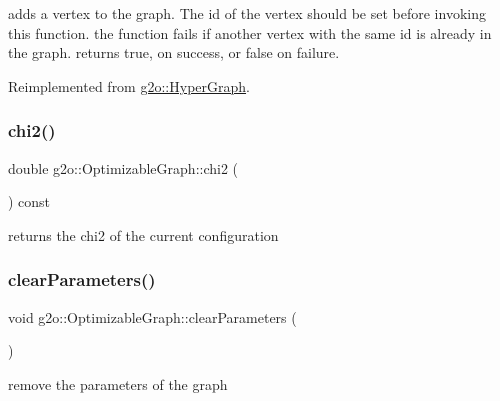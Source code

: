 adds a vertex to the graph. The id of the vertex should be set before invoking this function. the function fails if another vertex with the same id is already in the graph. returns true, on success, or false on failure. 

Reimplemented from \mbox{\hyperlink{classg2o_1_1_hyper_graph_a7ef87ba3479827b24c6fc29c5fc3aa21}{g2o\+::\+Hyper\+Graph}}.

\mbox{\label{structg2o_1_1_optimizable_graph_af0d53383e22347aba1bf76c1ce492f51}} 
\subsubsection{\texorpdfstring{chi2()}{chi2()}}
{\footnotesize\ttfamily double g2o\+::\+Optimizable\+Graph\+::chi2 (\begin{DoxyParamCaption}{ }\end{DoxyParamCaption}) const}



returns the chi2 of the current configuration 

\mbox{\label{structg2o_1_1_optimizable_graph_a15171b6d335115858e2e86dcf576ba78}} 
\subsubsection{\texorpdfstring{clear\+Parameters()}{clearParameters()}}
{\footnotesize\ttfamily void g2o\+::\+Optimizable\+Graph\+::clear\+Parameters (\begin{DoxyParamCaption}{ }\end{DoxyParamCaption})\hspace{0.3cm}{\ttfamily [virtual]}}

remove the parameters of the graph \mbox{\label{structg2o_1_1_optimizable_graph_a396e552ed234fe625e3b6785efa9c86d}} 
